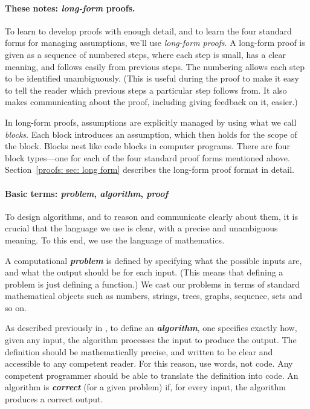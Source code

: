\paragraph{These notes: \emph{long-form} proofs.}
To learn to develop proofs with enough detail,
and to learn the four standard forms for managing assumptions,
we'll use \emph{long-form proofs}.
A long-form proof is given as a sequence of numbered steps,
where each step is small, has a clear meaning, and follows easily from previous steps.
The numbering allows each step to be identified unambiguously.
(This is useful during the proof to make it easy to tell the reader which previous steps a particular step follows from.
It also makes communicating about the proof, including giving feedback on it, easier.)

In long-form proofs, assumptions are explicitly managed by using what we call \emph{blocks}.
Each block introduces an assumption, which then holds for the scope of the block.
Blocks nest like code blocks in computer programs.
There are four block types---one for each of the four standard proof forms mentioned above. 
Section~\ref{proofs: sec: long form} describes the long-form proof format in detail.

\paragraph{Basic terms: \emph{problem}, \emph{algorithm}, \emph{proof}}
To design algorithms, and to reason and communicate clearly about them,
it is crucial that the language we use is clear,
with a precise and unambiguous meaning.
To this end, we use the language of mathematics.

A computational \textbf{\emph{problem}} is defined by
specifying what the possible inputs are,
and what the output should be for each input.
(This means that defining a problem is just defining a function.)
We cast our problems in terms of standard mathematical objects
such as numbers, strings, trees, graphs, sequence, sets and so on.

As described previously in ,
to define an \textbf{\emph{algorithm}}, one specifies exactly how,
given any input, the algorithm processes the input to produce the output.
The definition should be mathematically precise,
and written to be clear and accessible to any competent reader.
For this reason, use words, not code.
Any competent programmer should be able to translate the definition into code.
An algorithm is \textbf{\emph{correct}} (for a given problem) if,
for every input, the algorithm produces a correct output.


